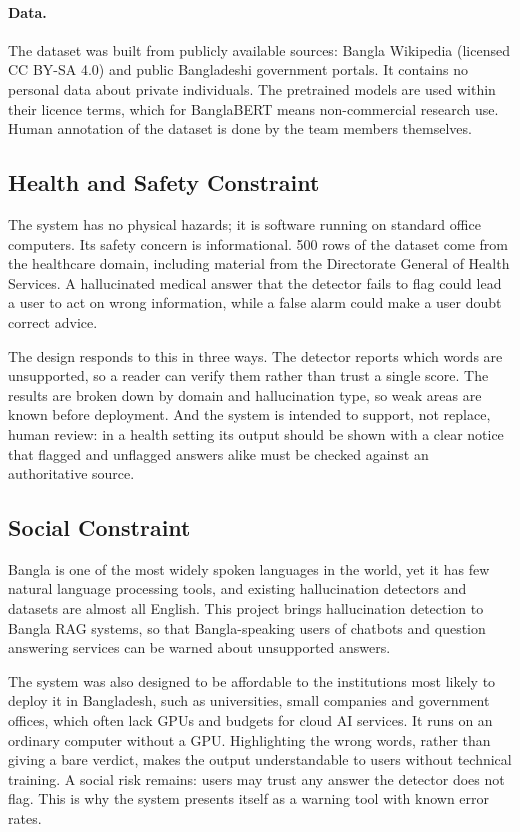 \paragraph{Data.} The dataset was built from publicly available sources: Bangla
Wikipedia (licensed CC BY-SA 4.0) and public Bangladeshi government portals. It
contains no personal data about private individuals. The pretrained models are
used within their licence terms, which for BanglaBERT means non-commercial
research use. Human annotation of the dataset is done by the team members
themselves.

\subsection{Health and Safety Constraint}

The system has no physical hazards; it is software running on standard office
computers. Its safety concern is informational. 500 rows of the dataset come
from the healthcare domain, including material from the Directorate General of
Health Services. A hallucinated medical answer that the detector fails to flag
could lead a user to act on wrong information, while a false alarm could make
a user doubt correct advice.

The design responds to this in three ways. The detector reports which words
are unsupported, so a reader can verify them rather than trust a single score.
The results are broken down by domain and hallucination type, so weak areas are
known before deployment. And the system is intended to support, not replace,
human review: in a health setting its output should be shown with a clear
notice that flagged and unflagged answers alike must be checked against an
authoritative source.

\subsection{Social Constraint}

Bangla is one of the most widely spoken languages in the world, yet it has few
natural language processing tools, and existing hallucination detectors and
datasets are almost all English. This project brings hallucination detection
to Bangla RAG systems, so that Bangla-speaking users of chatbots and question
answering services can be warned about unsupported answers.

The system was also designed to be affordable to the institutions most likely
to deploy it in Bangladesh, such as universities, small companies and
government offices, which often lack GPUs and budgets for cloud AI services.
It runs on an ordinary computer without a GPU. Highlighting the wrong words,
rather than giving a bare verdict, makes the output understandable to users
without technical training. A social risk remains: users may trust any answer
the detector does not flag. This is why the system presents itself as a
warning tool with known error rates.

